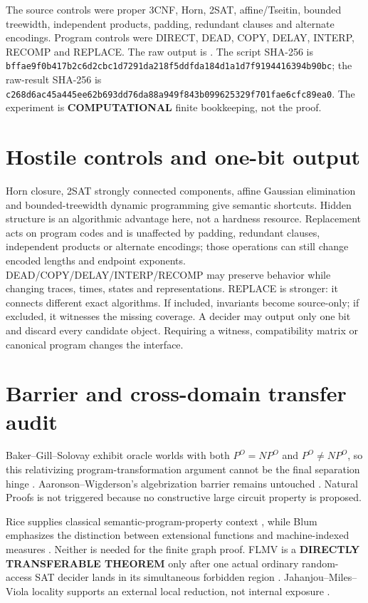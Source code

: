 \documentclass[11pt]{article}
\newcommand{\COMP}{\textbf{COMPUTATIONAL}}
\begin{document}
The source controls were proper 3CNF, Horn, 2SAT, affine/Tseitin,
bounded treewidth, independent products, padding, redundant clauses and
alternate encodings. Program controls were DIRECT, DEAD, COPY, DELAY,
INTERP, RECOMP and REPLACE. The raw output is
.
The script SHA-256 is
\nolinkurl{bffae9f0b417b2c6d2cbc1d7291da218f5ddfda184d1a1d7f9194416394b90bc};
the raw-result SHA-256 is
\nolinkurl{c268d6ac45a445ee62b693dd76da88a949f843b099625329f701fae6cfc89ea0}.
The experiment is \COMP{} finite bookkeeping, not the proof.

\section{Hostile controls and one-bit output}
Horn closure, 2SAT strongly connected components, affine Gaussian
elimination and bounded-treewidth dynamic programming give semantic
shortcuts. Hidden structure is an algorithmic advantage here, not a hardness
resource. Replacement acts on program codes and is unaffected by padding,
redundant clauses, independent products or alternate encodings; those
operations can still change encoded lengths and endpoint exponents.
DEAD/COPY/DELAY/INTERP/RECOMP may preserve behavior while changing traces,
times, states and representations. REPLACE is stronger: it connects
different exact algorithms. If included, invariants become source-only; if
excluded, it witnesses the missing coverage. A decider may output only one
bit and discard every candidate object. Requiring a witness, compatibility
matrix or canonical program changes the interface.

\section{Barrier and cross-domain transfer audit}
Baker--Gill--Solovay exhibit oracle worlds with both \(P^O=NP^O\) and
\(P^O\ne NP^O\), so this relativizing program-transformation argument cannot
be the final separation hinge \cite{BGS75}. Aaronson--Wigderson's
algebrization barrier remains untouched \cite{AW09}. Natural Proofs is not
triggered because no constructive large circuit property is proposed.

Rice supplies classical semantic-program-property context \cite{Rice53},
while Blum emphasizes the distinction between extensional functions and
machine-indexed measures \cite{Blum67}. Neither is needed for the finite
graph proof. FLMV is a \textbf{DIRECTLY TRANSFERABLE THEOREM} only after one
actual ordinary random-access SAT decider lands in its simultaneous forbidden
region \cite{FLMV05}. Jahanjou--Miles--Viola locality supports an external
local reduction, not internal exposure \cite{JMV14}.
\end{document}
